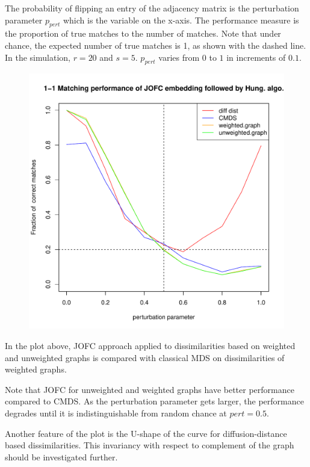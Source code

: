 \documentclass[11pt]{article} %
\begin{document}
  The probability of flipping an entry of the adjacency matrix is the perturbation parameter $p_{pert}$ which is the variable on the x-axis. 
  The performance measure is the proportion of true matches to the number of matches. Note that 
  under chance, the expected number of true matches is 1, as shown with the dashed line. In the simulation, $r=20$ and $s=5$. $p_{pert}$ varies from $0$ to $1$ in increments of $0.1$. 
\begin{figure}
  \includegraphics[scale=0.65]{FidCommPapergraph-plot-1.pdf}
\end{figure}


In the plot above, JOFC approach applied to  dissimilarities based on weighted and unweighted graphs is compared with classical MDS on dissimilarities of weighted graphs.

Note that JOFC for unweighted and weighted graphs  have better performance compared to CMDS. As the perturbation parameter gets larger, the performance degrades until it is indistinguishable from random chance at $pert=0.5$.

Another feature of the plot is the U-shape of the curve for diffusion-distance based dissimilarities. This invariancy with respect to complement of the graph should be investigated further.

  
\end{document}
